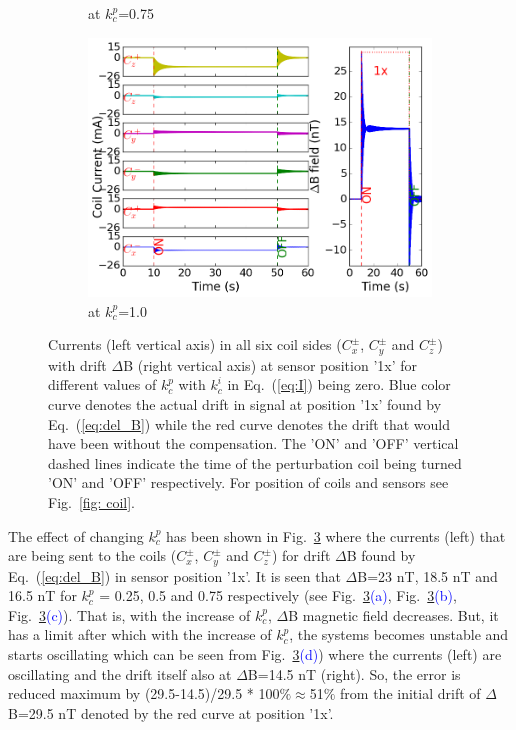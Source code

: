 \begin{figure}[!htb]
\begin{subfigure}{.5\linewidth}
        \caption{at $k_c^p$=0.75}
        \label{fig:p75m}
    \end{subfigure}%
        \begin{subfigure}{.5\linewidth}
        \centering
        \includegraphics[width=\linewidth, height= 6.5 cm]{Images/p100}
        \caption{at $k_c^p$=1.0}
        \label{fig:p100m}
    \end{subfigure}

    \caption{Currents (left vertical axis) in all six coil sides ($C_x^\pm$, $C_y^\pm$ and $C_z^\pm$) with drift $\Delta$B (right vertical axis) at sensor position '1x' for different values of $k_c^p$ with $k_c^i$ in Eq.~(\ref{eq:I}) being zero. Blue color curve denotes the actual drift in signal at position '1x' found by Eq.~(\ref{eq:del_B}) while the red curve denotes the drift that would have been without the compensation. The 'ON' and 'OFF' vertical dashed lines indicate the time of the perturbation coil being turned 'ON' and 'OFF' respectively. For position of coils and sensors see Fig.~\ref{fig: coil}. }
    \label{fig:p_pi_m}
\end{figure}

The effect of changing $k_c^p$ has been shown in Fig.~\ref{fig:p_pi_m} where the currents (left) that are being sent to the coils ($C_x^\pm$, $C_y^\pm$ and $C_z^\pm$) for drift $\Delta$B found by Eq.~(\ref{eq:del_B}) in sensor position '1x'.  It is seen that $\Delta$B=23 nT, 18.5 nT and 16.5 nT for $k_c^p$ = 0.25, 0.5 and 0.75 respectively (see Fig.~\ref{fig:p_pi_m}\textcolor{blue}{(a)}, Fig.~\ref{fig:p_pi_m}\textcolor{blue}{(b)}, Fig.~\ref{fig:p_pi_m}\textcolor{blue}{(c)}). That is, with the increase of $k_c^p$, $\Delta$B magnetic field decreases. But, it has a limit after which with the increase of $k_c^p$, the systems becomes unstable and starts oscillating which can be seen from Fig.~\ref{fig:p_pi_m}\textcolor{blue}{(d)}) where the currents (left) are oscillating and the drift itself also at $\Delta$B=14.5 nT (right). So, the error is reduced maximum by (29.5-14.5)/29.5 * 100$\%\approx$51$\%$ from the initial drift of $\Delta$B=29.5 nT denoted by the red curve at position '1x'. 

